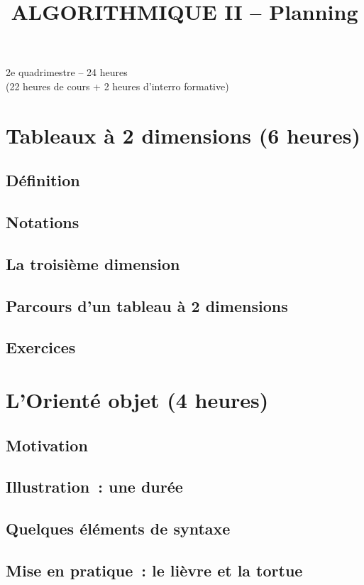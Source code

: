 \documentclass[a4paper]{article}
\begin{document}
\title{ALGORITHMIQUE II – Planning}
\maketitle

2e quadrimestre – 24 heures \\ 
(22 heures de cours + 2 heures d'interro formative)


\section{Tableaux à 2 dimensions (6 heures)}

\subsection{Définition}
\subsection{Notations}
\subsection{La troisième dimension}
\subsection{Parcours d'un tableau à 2 dimensions}
\subsection{Exercices}

\section{L'Orienté objet (4 heures)}
\subsection{Motivation}
\subsection{Illustration~: une durée}
\subsection{Quelques éléments de syntaxe}
\subsection{Mise en pratique~: le lièvre et la tortue}
\end{document}
